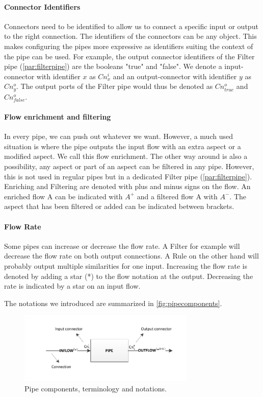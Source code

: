 \paragraph{Connector Identifiers} Connectors need to be identified to allow us to connect a specific input or output to the right connection. The identifiers of the connectors can be any object. This makes configuring the pipes more expressive as identifiers suiting the context of the pipe can be used. For example, the output connector identifiers of the Filter pipe (\autoref{par:filterpipe}) are the booleans "true" and "false". We denote a input-connector with identifier $x$ as $Cn^i_x$ and an output-connector with identifier $y$ as $Cn^o_y$. The output ports of the Filter pipe would thus be denoted as $Cn^o_{true}$ and $Cn^o_{false}$.

\paragraph{Flow enrichment and filtering} In every pipe, we can push out whatever we want. However, a much used situation is where the pipe outputs the input flow with an extra aspect or a modified aspect. We call this flow enrichment. The other way around is also a possibility, any aspect or part of an aspect can be filtered in any pipe. However, this is not used in regular pipes but in a dedicated Filter pipe (\autoref{par:filterpipe}). Enriching and Filtering are denoted with plus and minus signs on the flow. An enriched flow A can be indicated with $A^+$ and a filtered flow A with $A^-$. The aspect that has been filtered or added can be indicated between brackets.

\paragraph{Flow Rate} Some pipes can increase or decrease the flow rate. A Filter for example will decrease the flow rate on both output connections. A Rule on the other hand will probably output multiple similarities for one input. Increasing the flow rate is denoted by adding a star (*) to the flow notation at the output. Decreasing the rate is indicated by a star on an input flow.

The notations we introduced are summarized in \autoref{fig:pipecomponents}.

\begin{figure}[htb]
	\centering
		\includegraphics[width=0.75\textwidth]{fig/pipecomponents}
	\caption{Pipe components, terminology and notations.}
	\label{fig:pipecomponents}
\end{figure}

